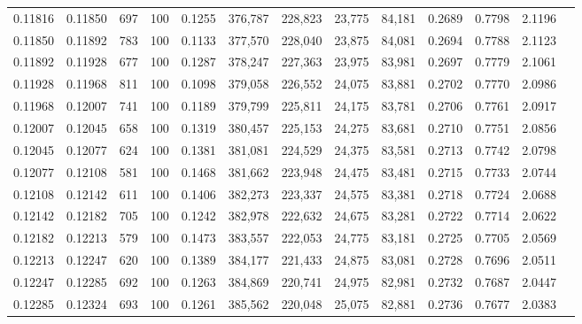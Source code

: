 \begin{tabular}{rrrrrrrrrrrrr}
0.11816 & 0.11850 &   697 & 100 &                                     0.1255 & 376,787 & 228,823 &  23,775 &  84,181 & 0.2689 & 0.7798 & 2.1196 \\
0.11850 & 0.11892 &   783 & 100 &                                     0.1133 & 377,570 & 228,040 &  23,875 &  84,081 & 0.2694 & 0.7788 & 2.1123 \\
0.11892 & 0.11928 &   677 & 100 &                                     0.1287 & 378,247 & 227,363 &  23,975 &  83,981 & 0.2697 & 0.7779 & 2.1061 \\
0.11928 & 0.11968 &   811 & 100 &                                     0.1098 & 379,058 & 226,552 &  24,075 &  83,881 & 0.2702 & 0.7770 & 2.0986 \\
0.11968 & 0.12007 &   741 & 100 &                                     0.1189 & 379,799 & 225,811 &  24,175 &  83,781 & 0.2706 & 0.7761 & 2.0917 \\
0.12007 & 0.12045 &   658 & 100 &                                     0.1319 & 380,457 & 225,153 &  24,275 &  83,681 & 0.2710 & 0.7751 & 2.0856 \\
0.12045 & 0.12077 &   624 & 100 &                                     0.1381 & 381,081 & 224,529 &  24,375 &  83,581 & 0.2713 & 0.7742 & 2.0798 \\
0.12077 & 0.12108 &   581 & 100 &                                     0.1468 & 381,662 & 223,948 &  24,475 &  83,481 & 0.2715 & 0.7733 & 2.0744 \\
0.12108 & 0.12142 &   611 & 100 &                                     0.1406 & 382,273 & 223,337 &  24,575 &  83,381 & 0.2718 & 0.7724 & 2.0688 \\
0.12142 & 0.12182 &   705 & 100 &                                     0.1242 & 382,978 & 222,632 &  24,675 &  83,281 & 0.2722 & 0.7714 & 2.0622 \\
0.12182 & 0.12213 &   579 & 100 &                                     0.1473 & 383,557 & 222,053 &  24,775 &  83,181 & 0.2725 & 0.7705 & 2.0569 \\
0.12213 & 0.12247 &   620 & 100 &                                     0.1389 & 384,177 & 221,433 &  24,875 &  83,081 & 0.2728 & 0.7696 & 2.0511 \\
0.12247 & 0.12285 &   692 & 100 &                                     0.1263 & 384,869 & 220,741 &  24,975 &  82,981 & 0.2732 & 0.7687 & 2.0447 \\
0.12285 & 0.12324 &   693 & 100 &                                     0.1261 & 385,562 & 220,048 &  25,075 &  82,881 & 0.2736 & 0.7677 & 2.0383 \\

\end{tabular}
